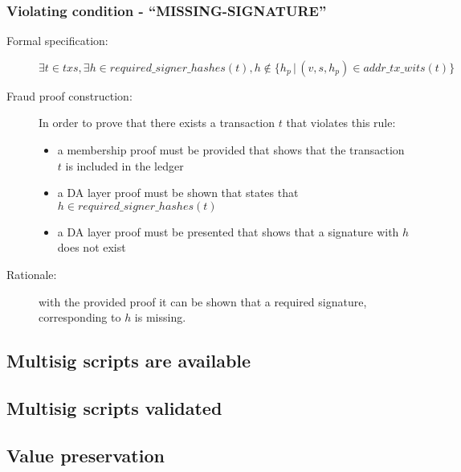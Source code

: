 \documentclass[../midgard.tex]{subfiles}
\begin{document}
\subsubsection{Violating condition - ``MISSING-SIGNATURE''}
\label{sec:MISSING-SIGNATURE}

\begin{description}

\item[Formal specification:]
\begin{equation*}
    \exists t \in txs, \exists h \in required\_signer\_hashes(t), h \notin \{ h_p \, | \, (v, s, h_p) \in addr\_tx\_wits(t) \}
\end{equation*}

\item[Fraud proof construction:] In order to prove that there exists a transaction $t$ that violates this rule:
\begin{itemize}
    \item a membership proof must be provided that shows that the transaction $t$ is included in the ledger
    \item a DA layer proof must be shown that states that $h \in required\_signer\_hashes(t)$
    \item a DA layer proof must be presented that shows that a signature with $h$ does not exist
\end{itemize}

\item[Rationale:] with the provided proof it can be shown that a required signature, corresponding to $h$ is missing.

\end{description}

\subsection{Multisig scripts are available}

\subsection{Multisig scripts validated}

\subsection{Value preservation}
\end{document}
